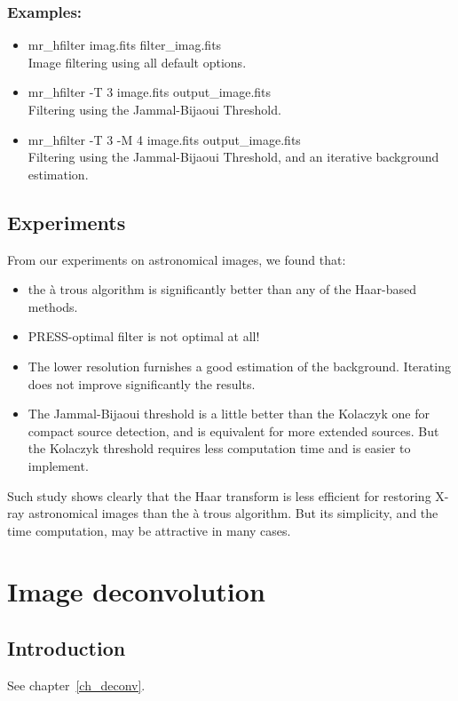 \begin{itemize}
\subsubsection*{Examples:}
\begin{itemize}
\baselineskip=0.4truecm
\itemsep=0.1truecm
\item mr\_hfilter imag.fits filter\_imag.fits\\
Image filtering using all default options.
\item mr\_hfilter -T 3  image.fits output\_image.fits \\
Filtering using the Jammal-Bijaoui Threshold.
\item mr\_hfilter -T 3 -M 4 image.fits output\_image.fits \\
Filtering using the Jammal-Bijaoui Threshold, and an iterative 
background estimation.
\end{itemize}

\subsection*{Experiments}
From our experiments on astronomical images, we found that:
\begin{itemize}
\item the \`a trous algorithm is significantly better than any of 
the Haar-based methods.
\item PRESS-optimal filter is not optimal at all!
\item The lower resolution furnishes a good estimation of the background.
Iterating does not improve significantly the results.
\item The Jammal-Bijaoui threshold is a little better than the Kolaczyk 
one for compact source detection, and is equivalent for more extended sources.
But the Kolaczyk threshold requires less computation time and is 
easier to implement.
\end{itemize}
Such  study shows clearly that the Haar transform is less efficient for 
restoring X-ray astronomical images than the \`a trous algorithm. But its
simplicity, and the time computation, may be attractive in many cases.

\clearpage
\newpage

\section{Image deconvolution}
\label{sect_deconv}
\subsection{Introduction}
See chapter~\ref{ch_deconv}.


\end{itemize}
